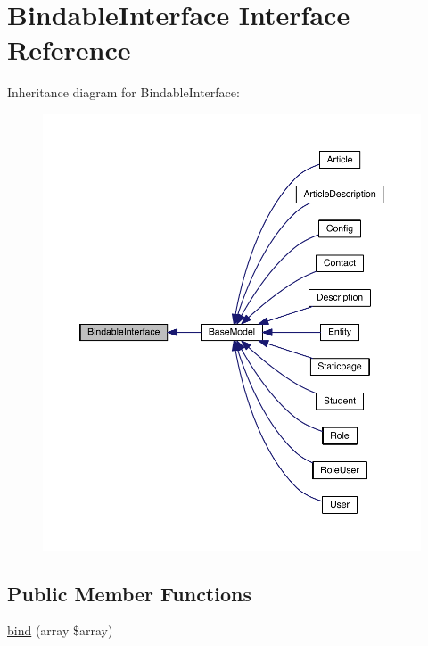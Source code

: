 \hypertarget{interfaceapp_1_1models_1_1core_1_1_bindable_interface}{\section{Bindable\-Interface Interface Reference}
\label{interfaceapp_1_1models_1_1core_1_1_bindable_interface}
}


Inheritance diagram for Bindable\-Interface\-:
\nopagebreak
\begin{figure}[H]
\begin{center}
\leavevmode
\includegraphics[width=350pt]{interfaceapp_1_1models_1_1core_1_1_bindable_interface__inherit__graph}
\end{center}
\end{figure}
\subsection*{Public Member Functions}
\begin{DoxyCompactItemize}
\item 
\hyperlink{interfaceapp_1_1models_1_1core_1_1_bindable_interface_a69ab89674a8b925945ad7e2a6d1c2de0}{bind} (array \$array)
\end{DoxyCompactItemize}


